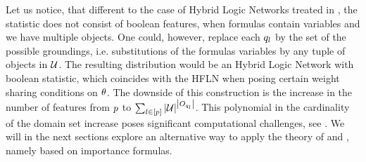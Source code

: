 Let us notice, that different to the case of Hybrid Logic Networks treated in , the statistic does not consist of boolean features, when formulas contain variables and we have multiple objects.
One could, however, replace each $q_{l}$ by the set of the possible groundings, i.e. substitutions of the formulas variables by any tuple of objects in $\mathcal{U}$.
The resulting distribution would be an Hybrid Logic Network with boolean statistic, which coincides with the HFLN when posing certain weight sharing conditions on $\theta$.
The downside of this construction is the increase in the number of features from $p$ to $\sum_{l\in[p]} \left|\mathcal{U}\right|^{\left|O_{q_{l}}\right|}$.
This polynomial in the cardinality of the domain set increase poses significant computational challenges, see \cite{domingos_markov_2006}.
We will in the next sections explore an alternative way to apply the theory of  and , namely based on importance formulas.




%









